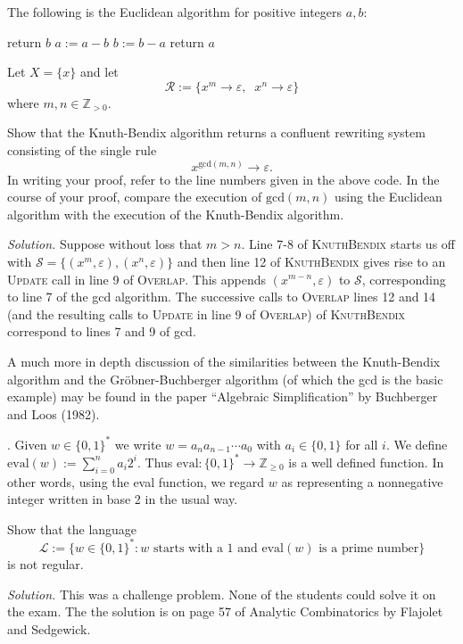 \documentclass[10pt,a4paper,reqno]{amsart}
\begin{document}
\bigskip
\noindent The following is the Euclidean algorithm for positive integers $a,b$:

\bigskip

\begin{algorithmic}[1]
    \State return $b$
    \EndIf
    \State $a := a-b$
    \Else
    \State $b := b-a$
    \EndIf
    \EndWhile
    \State return $a$
    \EndProcedure
\end{algorithmic}

\bigskip

Let $X=\{x\}$ and let $$\mathcal{R} := \{x^m\rightarrow \varepsilon,\;\;
x^n\rightarrow \varepsilon\}$$ where $m,n \in \mathbb{Z}_{>0}$.

Show that the Knuth-Bendix algorithm returns a confluent rewriting system
consisting of the single rule \[x^{\mathrm{gcd}(m,n)} \rightarrow
\varepsilon.\] In writing your proof, refer to the line numbers given in the
above code. In the course of your proof, compare the execution of
$\mathrm{gcd}(m,n)$ using the Euclidean algorithm with the execution of the
Knuth-Bendix algorithm.

\bigskip

\emph{Solution.} Suppose without loss that $m>n$. Line 7-8 of
\textsc{KnuthBendix} starts us off with $\mathcal{S} =
\{(x^m,\varepsilon),(x^n,\varepsilon)\}$ and then line 12 of
\textsc{KnuthBendix} gives rise to an \textsc{Update} call in line 9 of
\textsc{Overlap}. This appends $(x^{m-n},\varepsilon)$ to $\mathcal{S}$,
corresponding to line 7 of the gcd algorithm. The successive calls to
\textsc{Overlap} lines 12 and 14 (and the resulting calls to \textsc{Update} in
line 9 of \textsc{Overlap}) of \textsc{KnuthBendix} correspond to lines 7 and 9
of gcd.

A much more in depth discussion of the similarities between the Knuth-Bendix
algorithm and the Gr\"obner-Buchberger algorithm (of which the gcd is the basic
example) may be found in the paper ``Algebraic Simplification'' by Buchberger
and Loos (1982).

\bigskip

. Given \(w \in \{0,1\}^*\) we write $w = a_n a_{n-1} \cdots a_0$
with $a_i \in \{0,1\}$ for all $i$. We define $\mathrm{eval}(w) := \sum_{i=0}^n
a_i2^i$. Thus $\mathrm{eval} : \{0,1\}^* \rightarrow \mathbb{Z}_{\ge 0}$ is a
well defined function. In other words, using the eval function, we regard $w$
as representing a nonnegative integer written in base 2 in the usual way.

Show that the language \[\mathscr{L} := \{w \in \{0,1\}^* : w \text{ starts
with a } 1 \text{ and } \mathrm{eval}(w) \text{ is a prime number}\}\] is not
regular.

\bigskip

\emph{Solution.} This was a challenge problem. None of the students could solve
it on the exam. The the solution is on page 57 of Analytic Combinatorics by
Flajolet and Sedgewick.
\end{document}
